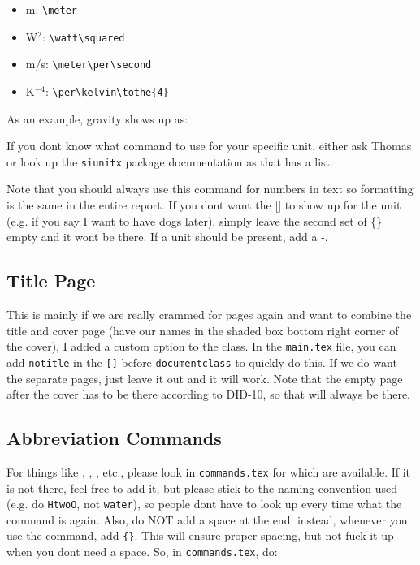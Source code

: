 \documentclass[../main.tex]{subfiles}
\begin{document}
\begin{itemize}
    \item m: \texttt{\textbackslash{}meter}
    \item W$^2$: \texttt{\textbackslash{}watt\textbackslash{}squared}
    \item m/s: \texttt{\textbackslash{}meter\textbackslash{}per\textbackslash{}second}
    \item K$^{-4}$: \texttt{\textbackslash{}per\textbackslash{}kelvin\textbackslash{}tothe\{4\}}
\end{itemize}

As an example, gravity shows up as: .

If you dont know what command to use for your specific unit, either ask Thomas or look up the \texttt{siunitx} package documentation as that has a list.

Note that you should always use this command for numbers in text so formatting is the same in the entire report. If you dont want the [] to show up for the unit (e.g. if you say I want to have  dogs later), simply leave the second set of \{\} empty and it wont be there. If a unit should be present, add a -.
 
\subsection{Title Page}

This is mainly if we are really crammed for pages again and want to combine the title and cover page (have our names in the shaded box bottom right corner of the cover), I added a custom option to the class. In the \texttt{main.tex} file, you can add \texttt{notitle} in the \texttt{[]} before \texttt{documentclass} to quickly do this. If we do want the separate pages, just leave it out and it will work. Note that the empty page after the cover has to be there according to DID-10, so that will always be there.

\subsection{Abbreviation Commands}

For things like \HtoGO{}, \HtoERMES{}, \COtwo{}, etc., please look in \texttt{commands.tex} for which are available. If it is not there, feel free to add it, but please stick to the naming convention used (e.g. do \texttt{HtwoO}, not \texttt{water}), so people dont have to look up every time what the command is again. Also, do NOT add a space at the end: instead, whenever you use the command, add \texttt{\{\}}. This will ensure proper spacing, but not fuck it up when you dont need a space. So, in \texttt{commands.tex}, do:
\end{document}
